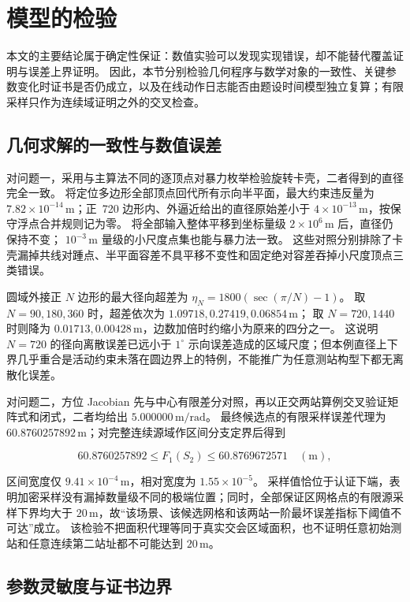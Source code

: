 \section{模型的检验}

本文的主要结论属于确定性保证：数值实验可以发现实现错误，却不能替代覆盖证明与误差上界证明。
因此，本节分别检验几何程序与数学对象的一致性、关键参数变化时证书是否仍成立，以及在线动作日志能否由题设时间模型独立复算；有限采样只作为连续域证明之外的交叉检查。

\subsection{几何求解的一致性与数值误差}

对问题一，采用与主算法不同的逐顶点对暴力枚举检验旋转卡壳，二者得到的直径完全一致。
将定位多边形全部顶点回代所有示向半平面，最大约束违反量为
$7.82\times10^{-14}\,\mathrm m$；正~720 边形内、外逼近给出的直径原始差小于
$4\times10^{-13}\,\mathrm m$，按保守浮点合并规则记为零。
将全部输入整体平移到坐标量级 $2\times10^6\,\mathrm m$ 后，直径仍保持不变；
$10^{-3}\,\mathrm m$ 量级的小尺度点集也能与暴力法一致。
这些对照分别排除了卡壳漏掉共线对踵点、半平面容差不具平移不变性和固定绝对容差吞掉小尺度顶点三类错误。

圆域外接正 $N$ 边形的最大径向超差为
$\eta_N=1800(\sec(\pi/N)-1)$。
取 $N=90,180,360$ 时，超差依次为 $1.09718,0.27419,0.06854\,\mathrm m$；
取 $N=720,1440$ 时则降为 $0.01713,0.00428\,\mathrm m$，边数加倍时约缩小为原来的四分之一。
这说明 $N=720$ 的径向离散误差已远小于 $1^\circ$ 示向误差造成的区域尺度；但本例直径上下界几乎重合是活动约束未落在圆边界上的特例，不能推广为任意测站构型下都无离散化误差。

对问题二，方位 Jacobian 先与中心有限差分对照，再以正交两站算例交叉验证矩阵式和闭式，二者均给出
$5.000000\,\mathrm{m/rad}$。
最终候选点的有限采样误差代理为 $60.8760257892\,\mathrm m$；对完整连续源域作区间分支定界后得到

\[
60.8760257892\le F_1(S_2)\le60.8769672571\quad(\mathrm m),
\]

区间宽度仅 $9.41\times10^{-4}\,\mathrm m$，相对宽度为 $1.55\times10^{-5}$。
采样值恰位于认证下端，表明加密采样没有漏掉数量级不同的极端位置；同时，全部保证区网格点的有限源采样下界均大于 $20\,\mathrm m$，故“该场景、该候选网格和该两站一阶最坏误差指标下阈值不可达”成立。
该检验不把面积代理等同于真实交会区域面积，也不证明任意初始测站和任意连续第二站址都不可能达到 $20\,\mathrm m$。

\subsection{参数灵敏度与证书边界}

